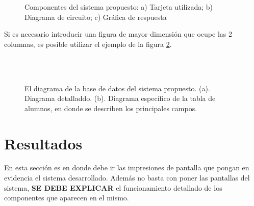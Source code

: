 \documentclass[conference]{IEEEtran}
\begin{document}
\begin{figure}
\caption{Componentes del sistema propuesto: a) Tarjeta utilizada; b) Diagrama de circuito; c) Gráfica de respuesta
}
\label{fig:nonlinearity}
\end{figure}
 
Si es necesario introducir una figura de mayor dimensión que ocupe las 2 columnas, es posible utilizar el ejemplo de la figura \ref{fig:setup}. 

\begin{figure}
\\
\\
\caption{El diagrama de la base de datos del sistema propuesto. (a). Diagrama detalladdo. (b). Diagrama específico de la tabla de alumnos, en donde se describen los principales campos. 
}
\label{fig:setup}
\end{figure}


\section{Resultados}

En esta sección es en donde debe ir las impresiones de pantalla que pongan en evidencia el sistema desarrollado. Además no basta con poner las pantallas del sistema, \textbf{SE DEBE EXPLICAR} el funcionamiento detallado de los componentes que aparecen en el mismo. 
\end{document}
